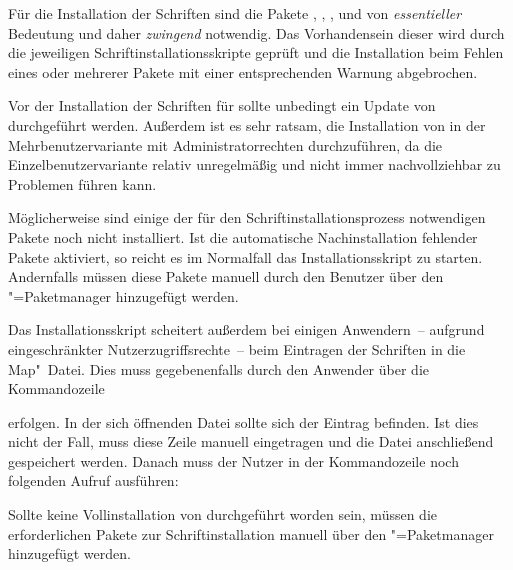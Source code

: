%
Für die Installation der Schriften sind die Pakete , 
, ,  und 
 von \emph{essentieller} Bedeutung und daher \emph{zwingend} 
notwendig. Das Vorhandensein dieser wird durch die jeweiligen 
Schriftinstallationsskripte geprüft und die Installation beim Fehlen eines oder 
mehrerer Pakete mit einer entsprechenden Warnung abgebrochen.

%
Vor der Installation der Schriften für \TUDScript sollte unbedingt ein Update 
von  durchgeführt werden. Außerdem ist es sehr 
ratsam, die Installation von  in der 
Mehrbenutzervariante mit Administratorrechten durchzuführen, da die 
Einzelbenutzervariante relativ unregelmäßig und nicht immer nachvollziehbar zu 
Problemen führen kann. 

Möglicherweise sind einige der für den Schriftinstallationsprozess notwendigen 
Pakete noch nicht installiert. Ist die automatische Nachinstallation fehlender 
Pakete aktiviert, so reicht es im Normalfall das Installationsskript zu 
starten. Andernfalls müssen diese Pakete manuell durch den Benutzer über den 
"=Paketmanager hinzugefügt werden.

Das Installationsskript scheitert außerdem bei einigen Anwendern~-- aufgrund 
eingeschränkter Nutzerzugriffsrechte~-- beim Eintragen der Schriften in die 
Map"~Datei. Dies muss gegebenenfalls durch den Anwender über die Kommandozeile 
%
\begin{quoting}
\end{quoting}
%
erfolgen. In der sich öffnenden Datei sollte sich der Eintrag 
 befinden. Ist dies nicht der Fall, muss diese Zeile 
manuell eingetragen und die Datei anschließend gespeichert werden. Danach muss 
der Nutzer in der Kommandozeile noch folgenden Aufruf ausführen:
%
\begin{quoting}
\end{quoting}


%
Sollte keine Vollinstallation von  durchgeführt 
worden sein, müssen die erforderlichen Pakete zur Schriftinstallation manuell 
über den "=Paketmanager hinzugefügt werden.

